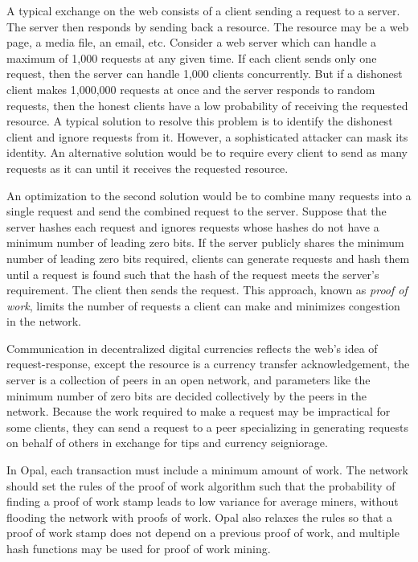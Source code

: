 \documentclass[10pt,twocolumn]{article}
\begin{document}
A typical exchange on the web consists of a client sending a request to a server.  The server then responds by sending back a resource.  The resource may be a web page, a media file, an email, etc.  Consider a web server which can handle a maximum of 1,000 requests at any given time.  If each client sends only one request, then the server can handle 1,000 clients concurrently.  But if a dishonest client makes 1,000,000 requests at once and the server responds to random requests, then the honest clients have a low probability of receiving the requested resource.  A typical solution to resolve this problem is to identify the dishonest client and ignore requests from it.  However, a sophisticated attacker can mask its identity.  An alternative solution would be to require every client to send as many requests as it can until it receives the requested resource.  

An optimization to the second solution would be to combine many requests into a single request and send the combined request to the server.  Suppose that the server hashes each request and ignores requests whose hashes do not have a minimum number of leading zero bits.  If the server publicly shares the minimum number of leading zero bits required, clients can generate requests and hash them until a request is found such that the hash of the request meets the server's requirement.  The client then sends the request.  This approach, known as {\em proof of work}, limits the number of requests a client can make and minimizes congestion in the network.

Communication in decentralized digital currencies reflects the web's idea of request-response, except the resource is a currency transfer acknowledgement, the server is a collection of peers in an open network, and parameters like the minimum number of zero bits are decided collectively by the peers in the network.  Because the work required to make a request may be impractical for some clients, they can send a request to a peer specializing in generating requests on behalf of others in exchange for tips and currency seigniorage.

In Opal, each transaction must include a minimum amount of work.  The network should set the rules of the proof of work algorithm such that the probability of finding a proof of work stamp leads to low variance for average miners, without flooding the network with proofs of work.  Opal also relaxes the rules so that a proof of work stamp does not depend on a previous proof of work, and multiple hash functions may be used for proof of work mining.
\end{document}
